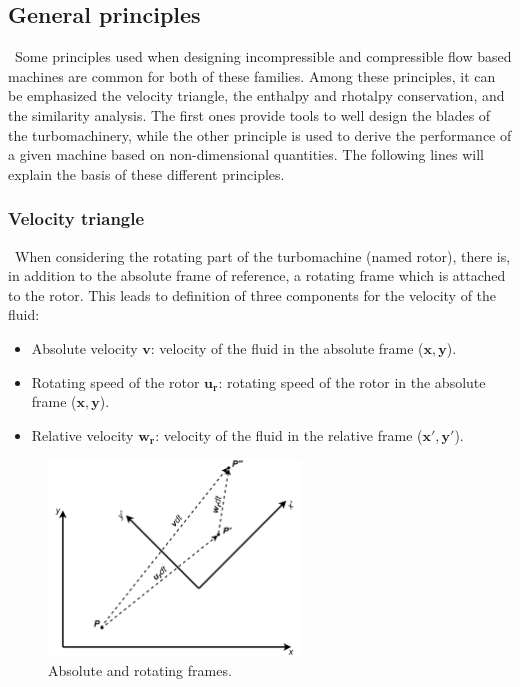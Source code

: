 \subsection{General principles}
\quad\ Some principles used when designing incompressible and compressible flow based machines are common for both of these families. Among these principles, it can be emphasized the velocity triangle, the enthalpy and rhotalpy conservation, and the similarity analysis. The first ones provide tools to well design the blades of the turbomachinery, while the other principle is used to derive the performance of a given machine based on non-dimensional quantities. The following lines will explain the basis of these different principles. 

\subsubsection{Velocity triangle}
\quad\ When considering the rotating part of the turbomachine (named rotor), there is, in addition to the absolute frame of reference, a rotating frame which is attached to the rotor. This leads to definition of three components for the velocity of the fluid: 

\begin{itemize}
    \item Absolute velocity \(\mathbf{v}\): velocity of the fluid in the absolute frame (\(\mathbf{x},\mathbf{y}\)).
    \item Rotating speed of the rotor \(\mathbf{u_r}\): rotating speed of the rotor in the absolute frame (\(\mathbf{x},\mathbf{y}\)).
    \item Relative velocity \(\mathbf{w_r}\): velocity of the fluid in the relative frame  (\(\mathbf{x'},\mathbf{y'}\)).
\end{itemize}

\begin{figure}[h]
    \centering
    \includegraphics[width=0.6\textwidth]{Frames.png}
    \caption{Absolute and rotating frames.}
    \label{fig:C4_frames}
\end{figure}

